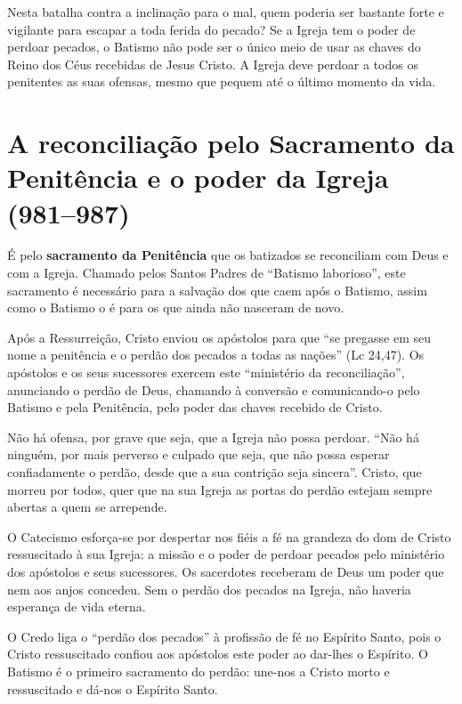 Nesta batalha contra a inclinação para o mal, quem poderia ser bastante forte e vigilante para escapar a toda ferida do pecado? Se a Igreja tem o poder de perdoar pecados, o Batismo não pode ser o único meio de usar as chaves do Reino dos Céus recebidas de Jesus Cristo. A Igreja deve perdoar a todos os penitentes as suas ofensas, mesmo que pequem até o último momento da vida.

\section{A reconciliação pelo Sacramento da Penitência e o poder da Igreja (981--987)}

É pelo \textbf{sacramento da Penitência} que os batizados se reconciliam com Deus e com a Igreja. Chamado pelos Santos Padres de ``Batismo laborioso'', este sacramento é necessário para a salvação dos que caem após o Batismo, assim como o Batismo o é para os que ainda não nasceram de novo.

Após a Ressurreição, Cristo enviou os apóstolos para que ``se pregasse em seu nome a penitência e o perdão dos pecados a todas as nações'' (Lc 24,47). Os apóstolos e os seus sucessores exercem este ``ministério da reconciliação'', anunciando o perdão de Deus, chamando à conversão e comunicando-o pelo Batismo e pela Penitência, pelo poder das chaves recebido de Cristo.

Não há ofensa, por grave que seja, que a Igreja não possa perdoar. ``Não há ninguém, por mais perverso e culpado que seja, que não possa esperar confiadamente o perdão, desde que a sua contrição seja sincera''. Cristo, que morreu por todos, quer que na sua Igreja as portas do perdão estejam sempre abertas a quem se arrepende.

O Catecismo esforça-se por despertar nos fiéis a fé na grandeza do dom de Cristo ressuscitado à sua Igreja: a missão e o poder de perdoar pecados pelo ministério dos apóstolos e seus sucessores. Os sacerdotes receberam de Deus um poder que nem aos anjos concedeu. Sem o perdão dos pecados na Igreja, não haveria esperança de vida eterna.

O Credo liga o ``perdão dos pecados'' à profissão de fé no Espírito Santo, pois o Cristo ressuscitado confiou aos apóstolos este poder ao dar-lhes o Espírito. O Batismo é o primeiro sacramento do perdão: une-nos a Cristo morto e ressuscitado e dá-nos o Espírito Santo.
